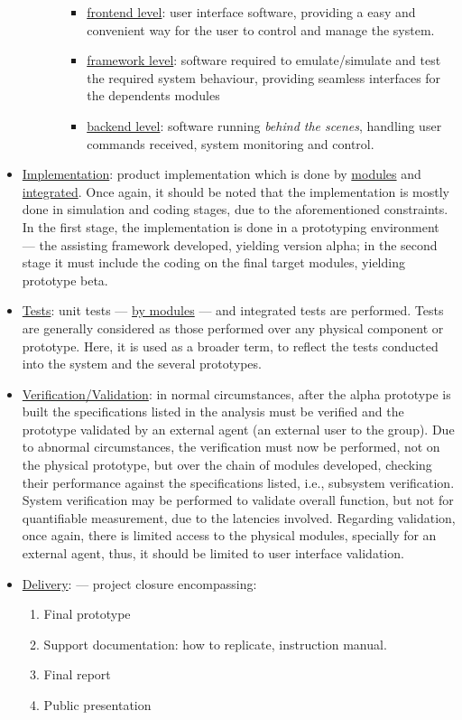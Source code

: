 \begin{itemize}
\begin{itemize}
\begin{itemize}
  \begin{itemize}
  \item \uline{frontend level}: user interface software, providing a easy and convenient
    way for the user to control and manage the system.
  \item \uline{framework level}: software required to emulate/simulate and test the
    required system behaviour, providing seamless interfaces for the dependents
    modules
  \item \uline{backend level}: software running \emph{behind the scenes}, handling user
    commands received, system monitoring and control.
  \end{itemize}
\end{itemize}
\end{itemize}
\item \uline{Implementation}: product implementation which is done by \uline{modules} and
\uline{integrated}. Once again, it should be noted that the implementation is
mostly done in simulation and coding stages, due to the aforementioned
constraints. In the first stage, the implementation is done in a prototyping
environment --- the assisting framework developed, yielding version alpha; in the second stage
it must include the coding on the final target modules, yielding
prototype beta.
\item \uline{Tests}: unit tests --- \uline{by modules} --- and integrated tests are
performed. Tests are generally considered as those performed over any physical
component or prototype. Here, it is used as a broader term, to reflect the tests
conducted into the system and the several prototypes.
\item \uline{Verification/Validation}: in normal circumstances, after the alpha
  prototype is built the specifications listed in the analysis must be verified
  and the prototype validated by an external agent (an external user to the
  group). Due to abnormal circumstances, the verification must now be performed,
  not on the physical prototype, but over the chain of modules developed,
  checking their performance against the specifications listed, i.e., subsystem
  verification. System verification may be performed to validate overall
  function, but not for quantifiable measurement, due to the latencies
  involved. Regarding validation, once again, there is limited access to the
  physical modules, specially for an external agent, thus, it should be limited
  to user interface validation.
\item \uline{Delivery}: --- project closure encompassing:
\begin{enumerate}
\item Final prototype
\item Support documentation: how to replicate, instruction manual.
\item Final report
\item Public presentation
\end{enumerate}
\end{itemize}


